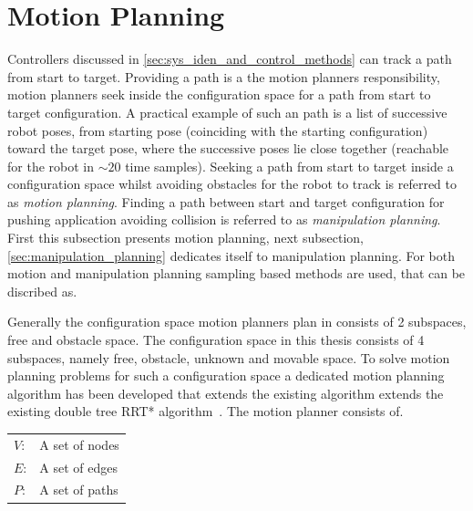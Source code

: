 \section{Motion Planning}%
\label{sec:motion_planning}

Controllers discussed in \cref{sec:sys_iden_and_control_methods} can track a path from start to target. Providing a path is a the motion planners responsibility, motion planners seek inside the configuration space for a path from start to target configuration. A practical example of such an path is a list of successive robot poses, from starting pose (coinciding with the starting configuration) toward the target pose, where the successive poses lie close together (reachable for the robot in $\sim20$ time samples). Seeking a path from start to target inside a configuration space whilst avoiding obstacles for the robot to track is referred to as \textit{motion planning}. Finding a path between start and target configuration for pushing application avoiding collision is referred to as \textit{manipulation planning}. First this subsection presents motion planning, next subsection, \cref{sec:manipulation_planning} dedicates itself to manipulation planning. For both motion and manipulation planning sampling based methods are used, that can be discribed as.\bs

\textit{}\bs

Generally the configuration space motion planners plan in consists of 2 subspaces, free and obstacle space. The configuration space in this thesis consists of 4 subspaces, namely free, obstacle, unknown and movable space. To solve motion planning problems for such a configuration space a dedicated motion planning algorithm has been developed that extends the existing algorithm extends the existing double tree \ac{RRT*} algorithm~\cite{chen_fast_2018}. The motion planner consists of.
\begin{center}
\begin{tabular}[t]{l p{10cm}}
$V$:& A set of nodes\\
$E$:& A set of edges\\
$P$:& A set of paths\\
\end{tabular}
\end{center}

